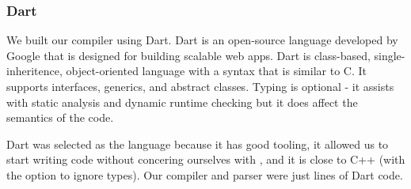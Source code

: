 
\subsubsection{Dart}
We built our compiler using Dart\cite{dartlang}.
Dart is an open-source language developed by Google that is
designed for building scalable web apps. Dart is class-based,
single-inheritence,
object-oriented language with a syntax that is similar to C. It supports
interfaces, generics, and abstract classes. Typing is optional - it assists
with static analysis and dynamic runtime checking but it does affect the
semantics of the code.

Dart was selected as the language because it has good tooling, it allowed
	us to start writing code without concering ourselves with ,
	and it is close to C++ (with the option to ignore types).
Our compiler and parser were just  lines of Dart code.
